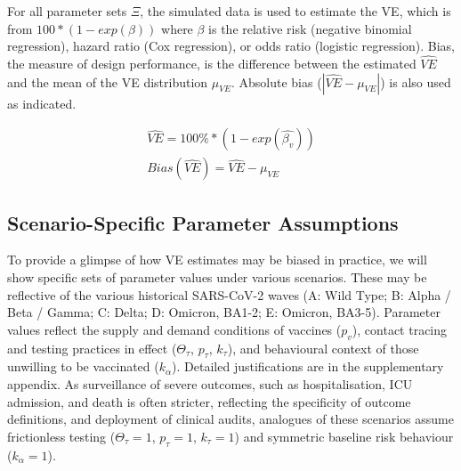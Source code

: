 \documentclass[12pt]{article}
\begin{document}
For all parameter sets $\Xi$, the simulated data is used to estimate the VE, which is from $100*(1-exp(\beta))$ where $\beta$ is the relative risk (negative binomial regression), hazard ratio (Cox regression), or odds ratio (logistic regression). Bias, the measure of design performance, is the difference between the estimated $\hat{VE}$ and the mean of the VE distribution $\mu_{VE}$. Absolute bias ($|\hat{VE} - \mu_{VE}|$) is also used as indicated.

\begin{eqnarray}
	\widehat{VE} = 100\% * (1 - exp(\widehat{\beta_v})) \\
	{Bias}(\widehat{VE}) = \widehat{VE} - \mu_{VE}
\end{eqnarray}

\subsection{Scenario-Specific Parameter Assumptions}
To provide a glimpse of how VE estimates may be biased in practice, we will show specific sets of parameter values under various scenarios. These may be reflective of the various historical SARS-CoV-2 waves (A: Wild Type; B: Alpha / Beta / Gamma; C: Delta; D: Omicron, BA1-2; E: Omicron, BA3-5). Parameter values reflect the supply and demand conditions of vaccines ($p_v$), contact tracing and testing practices in effect ($\Theta_{\tau}$, $p_\tau$, $k_\tau$), and behavioural context of those unwilling to be vaccinated ($k_\alpha$). Detailed justifications are in the supplementary appendix. As surveillance of severe outcomes, such as hospitalisation, ICU admission, and death is often stricter, reflecting the specificity of outcome definitions, and deployment of clinical audits, analogues of these scenarios assume frictionless testing ($\Theta_{\tau} = 1$, $p_\tau = 1$, $k_\tau = 1$) and symmetric baseline risk behaviour ($k_\alpha = 1$).
\end{document}
